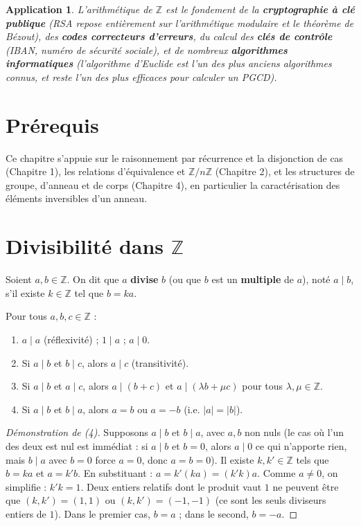 \documentclass[a4paper,12pt,openany]{book}
\newtheorem{application}{Application}[section]
\begin{document}
\begin{application}
L'arithmétique de $\mathbb{Z}$ est le fondement de la \textbf{cryptographie
à clé publique} (RSA repose entièrement sur l'arithmétique modulaire et le
théorème de Bézout), des \textbf{codes correcteurs d'erreurs}, du calcul
des \textbf{clés de contrôle} (IBAN, numéro de sécurité sociale), et de
nombreux \textbf{algorithmes informatiques} (l'algorithme d'Euclide est
l'un des plus anciens algorithmes connus, et reste l'un des plus efficaces
pour calculer un PGCD).
\end{application}

\section{Prérequis}

Ce chapitre s'appuie sur le raisonnement par récurrence et la disjonction
de cas (Chapitre 1), les relations d'équivalence et $\mathbb{Z}/n\mathbb{Z}$
(Chapitre 2), et les structures de groupe, d'anneau et de corps
(Chapitre 4), en particulier la caractérisation des éléments inversibles
d'un anneau.

\section{Divisibilité dans \texorpdfstring{$\mathbb{Z}$}{Z}}

\begin{definition}[5.1]
Soient $a,b\in\mathbb{Z}$. On dit que $a$ \textbf{divise} $b$ (ou que $b$
est un \textbf{multiple} de $a$), noté $a\mid b$, s'il existe
$k\in\mathbb{Z}$ tel que $b=ka$.
\end{definition}

\begin{proposition}[5.1]
Pour tous $a,b,c\in\mathbb{Z}$ :
\begin{enumerate}
  \item $a\mid a$ (réflexivité) ; $1\mid a$ ; $a \mid 0$.
  \item Si $a\mid b$ et $b\mid c$, alors $a\mid c$ (transitivité).
  \item Si $a\mid b$ et $a\mid c$, alors $a \mid (b+c)$ et
  $a \mid (\lambda b + \mu c)$ pour tous $\lambda,\mu\in\mathbb{Z}$.
  \item Si $a\mid b$ et $b\mid a$, alors $a=b$ ou $a=-b$ (i.e. $|a|=|b|$).
\end{enumerate}
\end{proposition}

\begin{proof}[Démonstration de (4)]
Supposons $a\mid b$ et $b\mid a$, avec $a,b$ non nuls (le cas où l'un des
deux est nul est immédiat : si $a\mid b$ et $b=0$, alors $a\mid0$ ce qui
n'apporte rien, mais $b\mid a$ avec $b=0$ force $a=0$, donc $a=b=0$).
Il existe $k,k'\in\mathbb{Z}$ tels que $b=ka$ et $a=k'b$. En substituant :
$a = k'(ka) = (k'k)a$. Comme $a\neq0$, on simplifie : $k'k=1$. Deux
entiers relatifs dont le produit vaut $1$ ne peuvent être que
$(k,k')=(1,1)$ ou $(k,k')=(-1,-1)$ (ce sont les seuls diviseurs entiers de
$1$). Dans le premier cas, $b=a$ ; dans le second, $b=-a$.
\end{proof}
\end{document}
